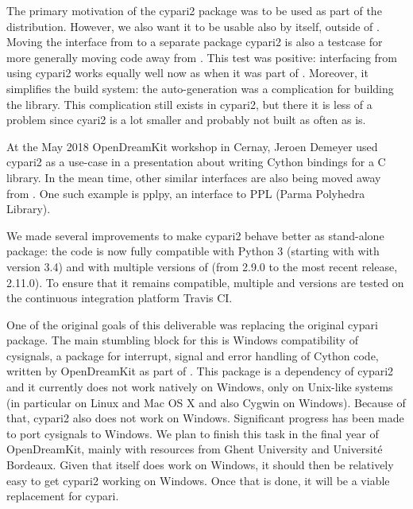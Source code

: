 \documentclass{deliverablereport}
\begin{document}
The primary motivation of the cypari2 package
was to be used as part of the \Sage distribution.
However, we also want it to be usable also by itself, outside of \Sage.
Moving the \PariGP interface from \Sage to a separate package cypari2
is also a testcase for more generally moving code away from \Sage.
This test was positive:
interfacing \PariGP from \Sage using cypari2 works equally well now
as when it was part of \Sage.
Moreover, it simplifies the \Sage build system:
the auto-generation was a complication for building the \Sage library.
This complication still exists in cypari2,
but there it is less of a problem since cyari2 is a lot smaller
and probably not built as often as \Sage is.

At the May 2018 OpenDreamKit workshop in Cernay,
Jeroen Demeyer used cypari2 as a use-case in a presentation
about writing Cython bindings for a C library.
In the mean time,
other similar interfaces are also being moved away from \Sage.
One such example is pplpy, an interface to PPL (Parma Polyhedra Library).

We made several improvements to make cypari2 behave better as stand-alone package:
the code is now fully compatible with Python 3 (starting with with version 3.4)
and with multiple versions of \PariGP (from 2.9.0 to the most recent release, 2.11.0).
To ensure that it remains compatible, multiple \Python and \PariGP
versions are tested on the continuous integration platform Travis CI.

One of the original goals of this deliverable was replacing the original
cypari package.
The main stumbling block for this is Windows compatibility of cysignals,
a package for interrupt, signal and error handling
of Cython code, written by OpenDreamKit as part of .
This package is a dependency of cypari2 and it
currently does not work natively on Windows,
only on Unix-like systems
(in particular on Linux and Mac OS X and also Cygwin on Windows).
Because of that, cypari2 also does not work on Windows.
Significant progress has been made to port cysignals to Windows.
We plan to finish this task in the final year of OpenDreamKit,
mainly with resources from Ghent University and Universit\'e Bordeaux.
Given that \PariGP itself does work on Windows,
it should then be relatively easy to get cypari2 working on Windows.
Once that is done, it will be a viable replacement for cypari.
\end{document}

